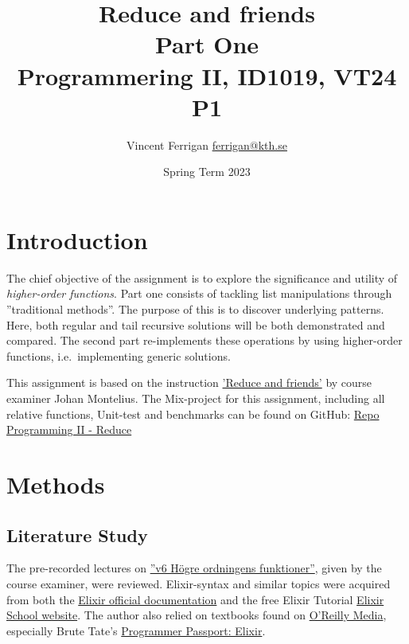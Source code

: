 \documentclass[a4paper,11pt]{article}
\begin{document}
\title{
    Reduce and friends
    \\Part One
\\\small{Programmering II, ID1019, VT24 P1}
}
\author{Vincent Ferrigan \href{mailto:ferrigan@kth.se}{ferrigan@kth.se}}

\date{Spring Term 2023}

\maketitle

\section*{Introduction}
\label{sec:introduction}
The chief objective of the assignment is to explore the significance and utility
of \emph{higher-order functions}.
Part one consists of tackling list manipulations through
''traditional methods''.
The purpose of this is to discover underlying patterns.
Here, both regular and tail recursive solutions will be both
demonstrated and compared.
The second part re-implements these operations by using higher-order functions,
i.e.\ implementing generic solutions.
%

This assignment is based on the instruction
\href{https://people.kth.se/~johanmon/courses/id1019/seminars/reduce/reduce.pdf}{'Reduce and friends'}
by course examiner Johan Montelius.
The Mix-project for this assignment, including all relative functions, Unit-test and benchmarks can be found on GitHub:
\href{https://github.com/VincentFerrigan/kth-id1019-programming-ii/tree/main/tasks/4/reduce}{Repo Programming II - Reduce}%
\section*{Methods}
\label{sec:methods}
\subsection*{Literature Study}
\label{subsec:literaturestudy}
The pre-recorded lectures on
\href{https://canvas.kth.se/courses/44911/assignments/syllabus}{''v6 Högre ordningens funktioner''},
given by the course examiner, were reviewed.
Elixir-syntax and similar topics were acquired
from both the
\href{https://elixir-lang.org/docs.html}{Elixir official documentation}
and the free Elixir Tutorial
\href{https://elixirschool.com/en}{Elixir School
website}.
The author also relied on textbooks found on
\href{https://learning.oreilly.com}{O'Reilly Media},
especially Brute Tate's
\href{https://learning.oreilly.com/library/view/programmer-passport-elixir/9781680509649/}{Programmer Passport: Elixir}.
\end{document}
